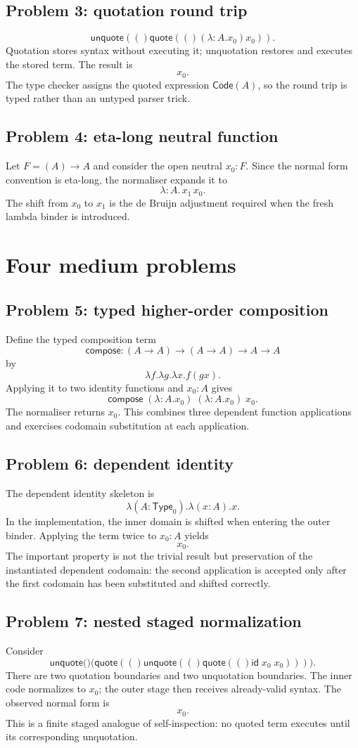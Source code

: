 \documentclass[11pt,a4paper]{article}
\newcommand{\Ty}{\mathsf{Type}}
\newcommand{\Code}{\mathsf{Code}}
\renewcommand{\quote}[1]{\mathsf{quote}(#1)}
\newcommand{\unquote}[1]{\mathsf{unquote}(#1)}
\begin{document}
\subsection{Problem 3: quotation round trip}
\[
\unquote(\quote((\lambda:A.x_0)x_0)).
\]
Quotation stores syntax without executing it; unquotation restores and executes the stored term. The result is
\[
\boxed{x_0}.
\]
The type checker assigns the quoted expression \(\Code(A)\), so the round trip is typed rather than an untyped parser trick.

\subsection{Problem 4: eta-long neutral function}
Let $F=(A)\to A$ and consider the open neutral $x_0:F$. Since the normal form convention is eta-long, the normaliser expands it to
\[
\boxed{\lambda:A.\,x_1\,x_0}.
\]
The shift from $x_0$ to $x_1$ is the de Bruijn adjustment required when the fresh lambda binder is introduced.

\section{Four medium problems}
\subsection{Problem 5: typed higher-order composition}
Define the typed composition term
\[
\mathsf{compose} : (A\to A)\to(A\to A)\to A\to A
\]
by
\[
\lambda f.\lambda g.\lambda x. f(gx).
\]
Applying it to two identity functions and $x_0:A$ gives
\[
\mathsf{compose}\;(\lambda:A.x_0)\;(\lambda:A.x_0)\;x_0.
\]
The normaliser returns $x_0$. This combines three dependent function applications and exercises codomain substitution at each application.

\subsection{Problem 6: dependent identity}
The dependent identity skeleton is
\[
\lambda(A:\Ty_0).\lambda(x:A).x.
\]
In the implementation, the inner domain is shifted when entering the outer binder. Applying the term twice to $x_0:A$ yields
\[
\boxed{x_0}.
\]
The important property is not the trivial result but preservation of the instantiated dependent codomain: the second application is accepted only after the first codomain has been substituted and shifted correctly.

\subsection{Problem 7: nested staged normalization}
Consider
\[
\unquote\bigl(\quote(\unquote(\quote(\mathsf{id}\;x_0\;x_0)))\bigr).
\]
There are two quotation boundaries and two unquotation boundaries. The inner code normalizes to $x_0$; the outer stage then receives already-valid syntax. The observed normal form is
\[
\boxed{x_0}.
\]
This is a finite staged analogue of self-inspection: no quoted term executes until its corresponding unquotation.
\end{document}
